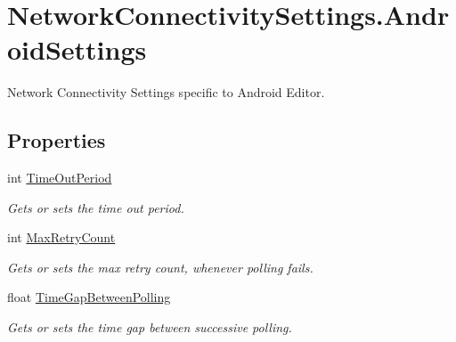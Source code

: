 \hypertarget{class_voxel_busters_1_1_native_plugins_1_1_network_connectivity_settings_1_1_android_settings}{}\section{Network\+Connectivity\+Settings.\+Android\+Settings}
\label{class_voxel_busters_1_1_native_plugins_1_1_network_connectivity_settings_1_1_android_settings}


Network Connectivity Settings specific to Android Editor.  


\subsection*{Properties}
\begin{DoxyCompactItemize}
\item 
int \hyperlink{class_voxel_busters_1_1_native_plugins_1_1_network_connectivity_settings_1_1_android_settings_aa042f2d5922ed5672d29246b911e1933}{Time\+Out\+Period}
\begin{DoxyCompactList}\small\item\em Gets or sets the time out period. \end{DoxyCompactList}\item 
int \hyperlink{class_voxel_busters_1_1_native_plugins_1_1_network_connectivity_settings_1_1_android_settings_af1774f57b5887760a799da4e3962d1a3}{Max\+Retry\+Count}
\begin{DoxyCompactList}\small\item\em Gets or sets the max retry count, whenever polling fails. \end{DoxyCompactList}\item 
float \hyperlink{class_voxel_busters_1_1_native_plugins_1_1_network_connectivity_settings_1_1_android_settings_a71f51bc367fbee9216f67fa85052ed99}{Time\+Gap\+Between\+Polling}
\begin{DoxyCompactList}\small\item\em Gets or sets the time gap between successive polling. \end{DoxyCompactList}\end{DoxyCompactItemize}


